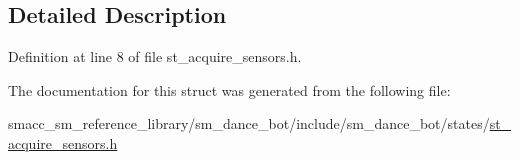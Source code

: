 \subsection{Detailed Description}


Definition at line 8 of file st\+\_\+acquire\+\_\+sensors.\+h.



The documentation for this struct was generated from the following file\+:\begin{DoxyCompactItemize}
\item 
smacc\+\_\+sm\+\_\+reference\+\_\+library/sm\+\_\+dance\+\_\+bot/include/sm\+\_\+dance\+\_\+bot/states/\hyperlink{st__acquire__sensors_8h}{st\+\_\+acquire\+\_\+sensors.\+h}\end{DoxyCompactItemize}
